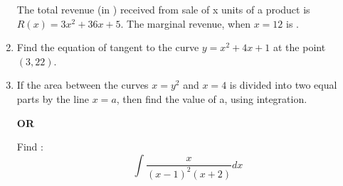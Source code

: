 \documentclass[12pt, a4paper]{article}
\begin{document}
\begin{enumerate}
The total revenue (in \rupee) received from sale of x units of a product is $R(x) = 3x^2 + 36x + 5$. The marginal revenue, when $x=12$ is \underline{\hspace{1cm}}.


\item Find the equation of tangent to the curve $y = x^2 + 4x + 1$ at the point $(3,22)$.


\item If the area between the curves  $x = y^2$ and $x = 4$ is divided into two equal parts by the line $x = a$, then find the value of a, using integration. \begin{center}\textbf{OR}\end{center}
Find : 
\\$$\int \dfrac {x}{(x-1)^2 (x+2)}dx$$



\end{enumerate}		
\end{document}
